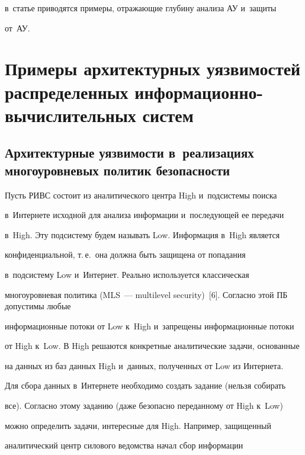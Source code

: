 в~статье приводятся примеры, отражающие глубину анализа АУ и~защиты 


от~АУ. 





  


\section{Примеры архитектурных уязвимостей распределенных информационно-вычислительных систем}





\subsection{Архитектурные уязвимости в~реализациях многоуровневых политик безопасности}


 


  Пусть РИВС состоит из аналитического центра High и~подсистемы поиска 


в~Интернете исходной для анализа информации и~последующей ее передачи 


в~High. Эту подсистему будем называть Low. Информация в~High является 


конфиденциальной, т.\,е.\ она должна быть защищена от попадания 


в~подсистему Low и~Интернет. Реально используется классическая 


многоуровневая политика (MLS~--- multilevel security)~[6]. Согласно этой ПБ допустимы любые 


информационные потоки от Low к~High и~запрещены информационные потоки 


от High к~Low. В High решаются конкретные аналитические задачи, основанные 


на данных из баз данных High и~данных, полученных от Low из Интернета. 


  


  Для сбора данных в~Интернете необходимо создать задание (нельзя собирать 


все). Согласно этому заданию (даже безопасно переданному от High к~Low) 


можно определить задачи, интересные для High. Например, защищенный 


аналитический центр силового ведомства начал сбор информации 


